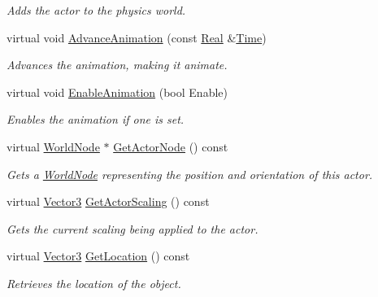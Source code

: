 \begin{DoxyCompactItemize}
\begin{DoxyCompactList}\small\item\em Adds the actor to the physics world. \item\end{DoxyCompactList}\item 
virtual void \hyperlink{classMezzanine_1_1ActorBase_ab245d50e649ec7335bbfcba86d9dc889}{AdvanceAnimation} (const \hyperlink{namespaceMezzanine_a726731b1a7df72bf3583e4a97282c6f6}{Real} \&\hyperlink{structMezzanine_1_1Time}{Time})
\begin{DoxyCompactList}\small\item\em Advances the animation, making it animate. \item\end{DoxyCompactList}\item 
virtual void \hyperlink{classMezzanine_1_1ActorBase_a28c9397e90ec680faf61845525312864}{EnableAnimation} (bool Enable)
\begin{DoxyCompactList}\small\item\em Enables the animation if one is set. \item\end{DoxyCompactList}\item 
virtual \hyperlink{classMezzanine_1_1WorldNode}{WorldNode} $\ast$ \hyperlink{classMezzanine_1_1ActorBase_a79803eb3d00e1e3722104fce473be085}{GetActorNode} () const 
\begin{DoxyCompactList}\small\item\em Gets a \hyperlink{classMezzanine_1_1WorldNode}{WorldNode} representing the position and orientation of this actor. \item\end{DoxyCompactList}\item 
virtual \hyperlink{classMezzanine_1_1Vector3}{Vector3} \hyperlink{classMezzanine_1_1ActorBase_a9255b5af0827d02505b7662486d8dd17}{GetActorScaling} () const 
\begin{DoxyCompactList}\small\item\em Gets the current scaling being applied to the actor. \item\end{DoxyCompactList}\item 
virtual \hyperlink{classMezzanine_1_1Vector3}{Vector3} \hyperlink{classMezzanine_1_1ActorBase_ab1706a379bf86d020e64e4b560cdeb73}{GetLocation} () const 
\begin{DoxyCompactList}\small\item\em Retrieves the location of the object. \item\end{DoxyCompactList}\item 

\end{DoxyCompactItemize}
